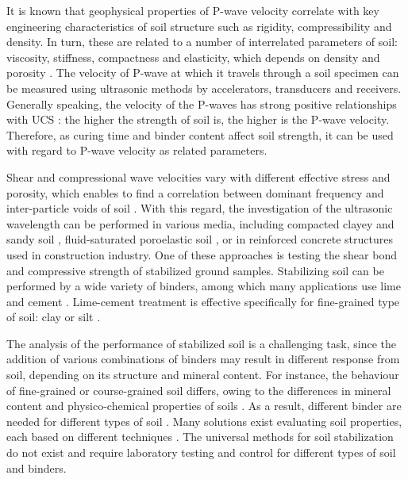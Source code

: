 \documentclass[USenglish,twocolumn]{article}
\begin{document}
It is known that geophysical properties of P-wave velocity correlate with key engineering characteristics of soil structure such as rigidity, compressibility and density. In turn, these are related to a number of interrelated parameters of soil: viscosity, stiffness, compactness and elasticity, which depends on density and porosity \cite{askeland2008essentials,askeland2005science}. The velocity of P-wave at which it travels through a soil specimen can be measured using ultrasonic methods by accelerators, transducers and receivers. Generally speaking, the velocity of the P-waves has strong positive relationships with UCS \cite{Sarno,Pellet}: the higher the strength of soil is, the higher is the P-wave velocity. Therefore, as curing time and binder content affect soil strength, it can be used with regard to P-wave velocity as related parameters. 

Shear and compressional wave velocities vary with different effective stress and porosity, which enables to find a correlation between dominant frequency and inter-particle voids of soil \cite{Gheibi}. With this regard, the investigation of the ultrasonic wavelength can be performed in various media, including compacted clayey and sandy soil \cite{Sarroetal2021}, fluid-saturated poroelastic soil \cite{Shietal2017}, or in reinforced concrete structures \cite{Carpinteri,Aggelis} used in construction industry. One of these approaches is testing the shear bond and compressive strength of stabilized ground samples. Stabilizing soil can be performed by a wide variety of binders, among which many applications use lime \cite{DiSanteetal2020,LindhLemenkova2022CEE} and cement \cite{Lemenkova202222}. Lime-cement treatment is effective specifically for fine-grained type of soil: clay or silt \cite{Brice,Heath,Addison,Rogers,Solanki}.  

The analysis of the performance of stabilized soil is a challenging task, since the addition of various combinations of binders may result in different response from soil, depending on its structure and mineral content. For instance, the behaviour of fine-grained \cite{Mitchell} or course-grained soil \cite{Wangetal2009} differs, owing to the differences in mineral content and physico-chemical properties of soils \cite{Lambe}. As a result, different binder are needed for different types of soil \cite{Lindh2001,Guoetal2003}. Many solutions exist evaluating soil properties, each based on different techniques \cite{Lindh2004,Glendinning,Lindh202201,NIGITHA2022,Lemenkov2021c}. The universal methods for soil stabilization do not exist and require laboratory testing and control for different types of soil and binders.
\end{document}
